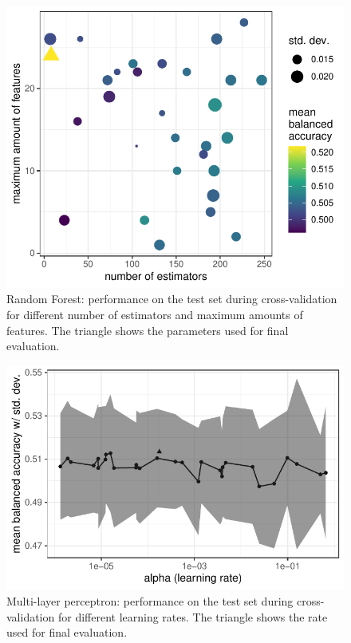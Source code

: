 \begin{figure}[!htpb]
  \includegraphics[width=\linewidth]{../stats/results/learning_curve_rf.pdf}
  \caption{Random Forest: performance on the test set during cross-validation for different number of estimators and maximum amounts of features. The triangle shows the parameters used for final evaluation.}
  \label{fig:learning_curve_rf}
\end{figure}

\begin{figure}[!htpb]
  \includegraphics[width=\linewidth]{../stats/results/learning_curve_mlp.pdf}
  \caption{Multi-layer perceptron: performance on the test set during cross-validation for different learning rates. The triangle shows the rate used for final evaluation.}
  \label{fig:learning_curve_mlp}
\end{figure}

